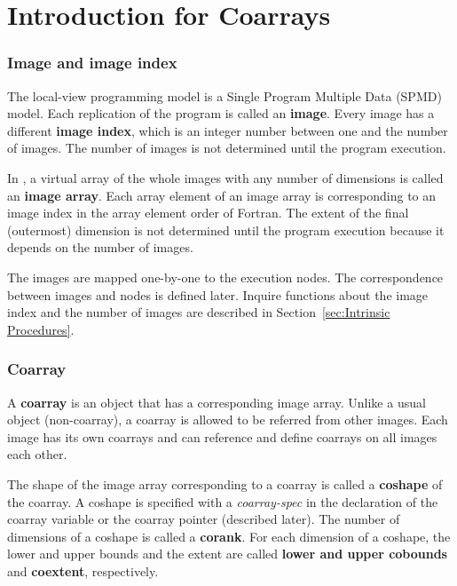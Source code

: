 \section{Introduction for Coarrays}
\label{sec:Introduction for Coarrays}

\subsubsection*{Image and image index}
The local-view programming model is a Single Program Multiple Data (SPMD) model.
Each replication of the program is called an {\bf image}.
Every image has a different {\bf image index}, which is an integer number 
between one and the number of images.
The number of images is not determined until the program execution.

In {\XMP}, a virtual array of the whole images with any number of dimensions 
is called an {\bf image array}. 
Each array element of an image array is corresponding to an image index
in the array element order of Fortran.
The extent of the final (outermost) dimension is not determined until
the program execution because it depends on the number of images.

The images are mapped one-by-one to the execution nodes.
The correspondence between images and nodes is defined later.
Inquire functions about the image index and the number of images 
are described in Section~\ref{sec:Intrinsic Procedures}.


\subsubsection*{Coarray}
A {\bf coarray} is an object that has a corresponding image array.
Unlike a usual object (non-coarray), a coarray is allowed to be
referred from other images. 
Each image has its own coarrays and can reference and define 
coarrays on all images each other.

The shape of the image array corresponding to a coarray is 
called a {\bf coshape} of the coarray.
A coshape is specified with a {\it coarray-spec} in the declaration of the 
coarray variable or the coarray pointer (described later).
The number of dimensions of a coshape is called a {\bf corank}.
For each dimension of a coshape, the lower and upper bounds and the extent
are called {\bf lower and upper cobounds} and {\bf coextent}, respectively.


